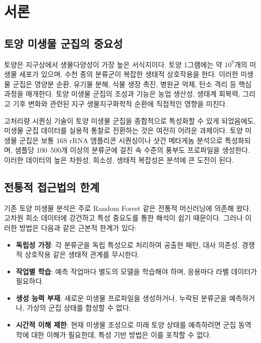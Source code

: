 \documentclass[11pt,a4paper]{article}
\begin{document}
\section{서론}

\subsection{토양 미생물 군집의 중요성}

토양은 지구상에서 생물다양성이 가장 높은 서식지이다. 토양 1그램에는 약 $10^9$개의 미생물 세포가 있으며, 수천 종의 분류군이 복잡한 생태적 상호작용을 한다. 이러한 미생물 군집은 영양분 순환, 유기물 분해, 식물 생장 촉진, 병원균 억제, 탄소 격리 등 핵심 과정을 매개한다. 토양 미생물 군집의 조성과 기능은 농업 생산성, 생태계 회복력, 그리고 기후 변화와 관련된 지구 생물지구화학적 순환에 직접적인 영향을 미친다.

고처리량 시퀀싱 기술이 토양 미생물 군집을 종합적으로 특성화할 수 있게 되었음에도, 미생물 군집 데이터를 실용적 통찰로 전환하는 것은 여전히 어려운 과제이다. 토양 미생물 군집은 보통 16S rRNA 앰플리콘 시퀀싱이나 샷건 메타게놈 분석으로 특성화되며, 샘플당 100--500개 이상의 분류군에 걸친 속 수준의 풍부도 프로파일을 생성한다. 이러한 데이터의 높은 차원성, 희소성, 생태적 복잡성은 분석에 큰 도전이 된다.

\subsection{전통적 접근법의 한계}

기존 토양 미생물 분석은 주로 Random Forest \citep{breiman2001random} 같은 전통적 머신러닝에 의존해 왔다. 고차원 희소 데이터에 강건하고 특성 중요도를 통한 해석이 쉽기 때문이다. 그러나 이러한 방법은 다음과 같은 근본적 한계가 있다:

\begin{itemize}[leftmargin=1.5em]
    \item \textbf{독립성 가정}: 각 분류군을 독립 특성으로 처리하여 공출현 패턴, 대사 의존성, 경쟁적 상호작용 같은 생태적 관계를 무시한다.
    \item \textbf{작업별 학습}: 예측 작업마다 별도의 모델을 학습해야 하며, 응용마다 라벨 데이터가 필요하다.
    \item \textbf{생성 능력 부재}: 새로운 미생물 프로파일을 생성하거나, 누락된 분류군을 예측하거나, 가상의 군집 상태를 합성할 수 없다.
    \item \textbf{시간적 이해 제한}: 현재 미생물 조성으로 미래 토양 상태를 예측하려면 군집 동역학에 대한 이해가 필요한데, 특성 기반 방법은 이를 포착할 수 없다.
\end{itemize}
\end{document}

